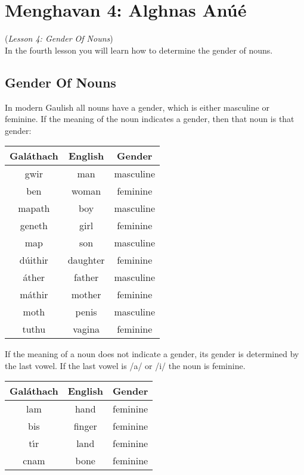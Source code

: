 \section{Menghavan 4: Alghnas An\'{u}\'{e}}
(\textit{Lesson 4: Gender Of Nouns})\\

In the fourth lesson you will learn how to determine the gender of nouns.

\subsection{Gender Of Nouns}

In modern Gaulish all nouns have a gender, which is either masculine or feminine. If the meaning of the noun indicates a gender, then that noun is that gender:
\begin{table}[H]
\centering
\begin{tabu}{c|c|c}
  \textbf{Gal\'{a}thach} & \textbf{English} & \textbf{Gender}\\
  \toprule
  gwir & man & masculine\\
  ben & woman & feminine\\
  mapath & boy & masculine\\
  geneth & girl & feminine\\
  map & son & masculine\\
  d\'{u}ithir & daughter & feminine\\
  \'{a}ther & father & masculine\\
  m\'{a}thir & mother & feminine\\
  moth & penis & masculine\\
  tuthu & vagina & feminine
\end{tabu}
\label{example_gender_meaning}
\end{table}

If the meaning of a noun does not indicate a gender, its gender is determined by the last vowel. If the last vowel is /a/ or /i/ the noun is feminine.
\begin{table}[H]
\centering
\begin{tabu}{c|c|c}
  \textbf{Gal\'{a}thach} & \textbf{English} & \textbf{Gender}\\
  \toprule
  lam & hand & feminine\\
  bis & finger & feminine\\
  t\'{\i}r & land & feminine\\
  cnam & bone & feminine
\end{tabu}
\label{example_gender_last_vowel_ai}
\end{table}

